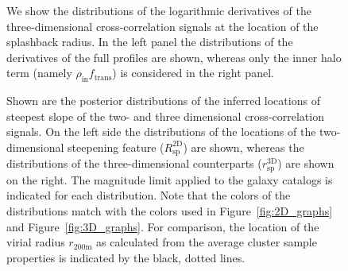 \documentclass[iop, apjl, twocolappendix, numberedappendix]{emulateapj}
\begin{document}
\begin{figure}
\caption{We show the distributions of the logarithmic derivatives of
the three-dimensional cross-correlation signals at the location of
the splashback radius. In the left panel the distributions of the
derivatives of the full profiles are shown, whereas only the inner
halo term (namely $\rho_{\mathrm{in}}f_{\mathrm{trans}}$) is
considered in the right panel.}
   \label{fig:derivatives} 
\end{figure}
\begin{figure}
\caption{Shown are the posterior distributions of the inferred
locations of steepest slope of the two- and three dimensional
cross-correlation signals. On the left side the distributions of the
locations of the two-dimensional steepening feature
($R_{\mathrm{sp}}^{\mathrm{2D}}$) are shown, whereas the
distributions of the three-dimensional counterparts
($r_{\mathrm{sp}}^{\mathrm{3D}}$) are shown on the right. The
magnitude limit applied to the galaxy catalogs is indicated for each
distribution. Note that the colors of the distributions match with
the colors used in Figure~\ref{fig:2D_graphs} and
Figure~\ref{fig:3D_graphs}. For comparison, the location of the virial
radius $r_{\mathrm{200m}}$ as calculated from the average cluster
sample properties is indicated by the black, dotted lines.}
   \label{fig:splashback} 
\end{figure}
\end{document}
